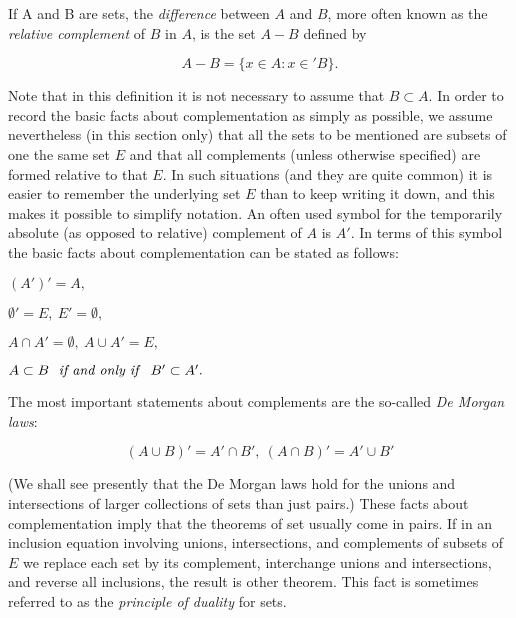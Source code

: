 
If A and B are sets, the \textit{difference} between $A$ and $B$, more often known as the \textit{relative complement} of $B$ in $A$, is the set $A - B$ defined by 

\begin{equation*}
A - B = \{ x \in A: x \in ' B \}.
\end{equation*}

Note that in this definition it is not necessary to assume that $B \subset A$. In order to record the basic facts about complementation as simply as possible, we assume nevertheless (in this section only) that all the sets to be mentioned are subsets of one the same set $E$ and that all complements (unless otherwise specified) are formed relative to that $E$. In such situations (and they are quite common) it is easier to remember the underlying set $E$ than to keep writing it down, and this makes it possible to simplify notation. An often used symbol for the temporarily absolute (as opposed to relative) complement of $A$ is $A'$. In terms of this symbol the basic facts about complementation can be stated as follows:

\begin{center}
$(A')' = A,$

$\emptyset ' = E, \: E' = \emptyset ,$

$ A \cap A' = \emptyset, \: A \cup A' = E,$

$A \subset B \text{ \textit{ if and only if } } B' \subset A'.$
\end{center}

The most important statements about complements are the so-called \textit{De Morgan laws}:

\begin{equation*}
(A \cup B)' = A' \cap B', \: (A \cap B)' = A' \cup B'
\end{equation*}

(We shall see presently that the De Morgan laws hold for the unions and intersections of larger collections of sets than just pairs.) These facts about complementation imply that the theorems of set usually come in pairs. If in an inclusion equation involving unions, intersections, and complements of subsets of $E$ we replace each set by its complement, interchange unions and intersections, and reverse all  inclusions, the result is other theorem. This fact is sometimes referred to as the \textit{principle of duality} for sets.

